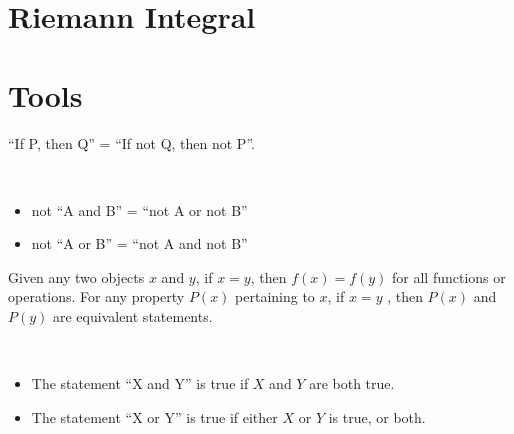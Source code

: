 \documentclass{blog}
\begin{document}
\section{Riemann Integral}

\appendix
\section{Tools}
\begin{definition}[implication]
  ``If P, then Q'' = ``If not Q, then not P''.
\end{definition}

\begin{lemma}~
  \begin{itemize}
  \item not ``A and B'' = ``not A or not B''
  \item not ``A or B'' = ``not A and not B''
  \end{itemize}
\end{lemma}

\begin{axiom}
  Given any two objects $x$ and $y$, if $x = y$, then $f(x) = f(y)$ for all functions or operations.
  For any property $P(x)$ pertaining to $x$, if $x=y$ , then $P(x)$ and $P(y)$ are equivalent statements.
\end{axiom}

\begin{definition}~
  \begin{itemize}
  \item The statement ``X and Y'' is true if $X$ and $Y$ are both true.
  \item The statement ``X or Y'' is true if either $X$ or $Y$ is true, or both.
  \end{itemize}
\end{definition}

\printbibliography
\end{document}
